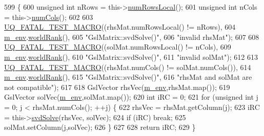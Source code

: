 \begin{DoxyCode}
599 \{
600   \textcolor{keywordtype}{unsigned} \textcolor{keywordtype}{int} nRows = this->\hyperlink{class_q_u_e_s_o_1_1_gsl_matrix_ab5ec937a9fd439eef1a87e12c0dbccb4}{numRowsLocal}();
601   \textcolor{keywordtype}{unsigned} \textcolor{keywordtype}{int} nCols = this->\hyperlink{class_q_u_e_s_o_1_1_gsl_matrix_ad5005f168fe030468e834776afb1859b}{numCols}();
602 
603   \hyperlink{_defines_8h_a56d63d18d0a6d45757de47fcc06f574d}{UQ\_FATAL\_TEST\_MACRO}((rhsMat.numRowsLocal() != nRows),
604                       \hyperlink{class_q_u_e_s_o_1_1_matrix_a247fb0fc0b87fecdee054bb4660b68e8}{m\_env}.\hyperlink{class_q_u_e_s_o_1_1_base_environment_a78b57112bbd0e6dd0e8afec00b40ffa7}{worldRank}(),
605                       \textcolor{stringliteral}{"GslMatrix::svdSolve()"},
606                       \textcolor{stringliteral}{"invalid rhsMat"});
607 
608   \hyperlink{_defines_8h_a56d63d18d0a6d45757de47fcc06f574d}{UQ\_FATAL\_TEST\_MACRO}((solMat.numRowsLocal() != nCols),
609                       \hyperlink{class_q_u_e_s_o_1_1_matrix_a247fb0fc0b87fecdee054bb4660b68e8}{m\_env}.\hyperlink{class_q_u_e_s_o_1_1_base_environment_a78b57112bbd0e6dd0e8afec00b40ffa7}{worldRank}(),
610                       \textcolor{stringliteral}{"GslMatrix::svdSolve()"},
611                       \textcolor{stringliteral}{"invalid solMat"});
612 
613   \hyperlink{_defines_8h_a56d63d18d0a6d45757de47fcc06f574d}{UQ\_FATAL\_TEST\_MACRO}((rhsMat.numCols() != solMat.numCols()),
614                       \hyperlink{class_q_u_e_s_o_1_1_matrix_a247fb0fc0b87fecdee054bb4660b68e8}{m\_env}.\hyperlink{class_q_u_e_s_o_1_1_base_environment_a78b57112bbd0e6dd0e8afec00b40ffa7}{worldRank}(),
615                       \textcolor{stringliteral}{"GslMatrix::svdSolve()"},
616                       \textcolor{stringliteral}{"rhsMat and solMat are not compatible"});
617 
618   GslVector rhsVec(\hyperlink{class_q_u_e_s_o_1_1_matrix_a247fb0fc0b87fecdee054bb4660b68e8}{m\_env},rhsMat.map());
619   GslVector solVec(\hyperlink{class_q_u_e_s_o_1_1_matrix_a247fb0fc0b87fecdee054bb4660b68e8}{m\_env},solMat.map());
620   \textcolor{keywordtype}{int} iRC = 0;
621   \textcolor{keywordflow}{for} (\textcolor{keywordtype}{unsigned} \textcolor{keywordtype}{int} j = 0; j < rhsMat.numCols(); ++j) \{
622     rhsVec = rhsMat.getColumn(j);
623     iRC = this->\hyperlink{class_q_u_e_s_o_1_1_gsl_matrix_ad4e17207209e41e4c91eefd31af4733c}{svdSolve}(rhsVec, solVec);
624     \textcolor{keywordflow}{if} (iRC) \textcolor{keywordflow}{break};
625     solMat.setColumn(j,solVec);
626   \}
627 
628   \textcolor{keywordflow}{return} iRC;
629 \}
\end{DoxyCode}
